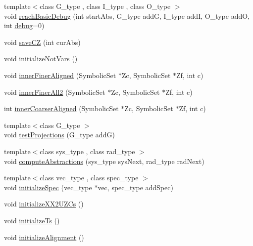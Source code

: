 \begin{DoxyCompactItemize}
\item 
{\footnotesize template$<$class G\+\_\+type , class I\+\_\+type , class O\+\_\+type $>$ }\\void \hyperlink{classscots_1_1Adaptive_ae1663a6a4ab0ffe2025f954be4fe4116}{reach\+Basic\+Debug} (int start\+Abs, G\+\_\+type addG, I\+\_\+type addI, O\+\_\+type addO, int \hyperlink{classscots_1_1Adaptive_a8ea5724cde577baf708496d6bef7e548}{debug}=0)
\item 
void \hyperlink{classscots_1_1Adaptive_ad3b8d9cf97cd0967409c14361a40d779}{save\+CZ} (int cur\+Abs)
\item 
void \hyperlink{classscots_1_1Adaptive_a6a9af6f25e8c4015ceb24d704da26972}{initialize\+Not\+Vars} ()
\item 
void \hyperlink{classscots_1_1Adaptive_af4c5423a62b8c11110d0a2bdcc96d4fb}{inner\+Finer\+Aligned} (Symbolic\+Set $\ast$Zc, Symbolic\+Set $\ast$Zf, int c)
\item 
void \hyperlink{classscots_1_1Adaptive_a4054eda5087611f78dddb2c378fcbb6e}{inner\+Finer\+All2} (Symbolic\+Set $\ast$Zc, Symbolic\+Set $\ast$Zf, int c)
\item 
int \hyperlink{classscots_1_1Adaptive_a01f8f69d290f9c81f76f6ab44d9ef193}{inner\+Coarser\+Aligned} (Symbolic\+Set $\ast$Zc, Symbolic\+Set $\ast$Zf, int c)
\item 
{\footnotesize template$<$class G\+\_\+type $>$ }\\void \hyperlink{classscots_1_1Adaptive_aa4f1995704cf927fff530e715a6214ec}{test\+Projections} (G\+\_\+type addG)
\item 
{\footnotesize template$<$class sys\+\_\+type , class rad\+\_\+type $>$ }\\void \hyperlink{classscots_1_1Adaptive_af6aeb2170e7223c1396454ab2b83fb09}{compute\+Abstractions} (sys\+\_\+type sys\+Next, rad\+\_\+type rad\+Next)
\item 
{\footnotesize template$<$class vec\+\_\+type , class spec\+\_\+type $>$ }\\void \hyperlink{classscots_1_1Adaptive_aac25a2399ed09b07ef546579c94b0726}{initialize\+Spec} (vec\+\_\+type $\ast$vec, spec\+\_\+type add\+Spec)
\item 
void \hyperlink{classscots_1_1Adaptive_ad7b09416eb224909dcfddcb6487b3b82}{initialize\+X\+X2\+U\+Z\+Cs} ()
\item 
void \hyperlink{classscots_1_1Adaptive_aec99424e29ff42e2e7e46f747cb6ed34}{initialize\+Ts} ()
\item 
void \hyperlink{classscots_1_1Adaptive_a8f23922cbd2768a8339c73928ddc9c5a}{initialize\+Alignment} ()

\end{DoxyCompactItemize}
